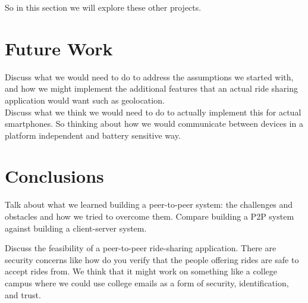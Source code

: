 \documentclass[letterpaper,11pt,twocolumn]{article}
\begin{document}
So in this section we will explore these other projects.

\section{Future Work}
Discuss what we would need to do to address the assumptions we started with, and how we might implement the additional features that an actual ride sharing application would want such as geolocation. \\

Discuss what we think we would need to do to actually implement this for actual smartphones. So thinking about how we would communicate between devices in a platform independent and battery sensitive way. 

\section{Conclusions}
Talk about what we learned building a peer-to-peer system: the challenges and obstacles and how we tried to overcome them. Compare building a P2P system against building a client-server system.

Discuss the feasibility of a peer-to-peer ride-sharing application. There are security concerns like how do you verify that the people offering rides are safe to accept rides from. We think that it might work on something like a college campus where we could use college emails as a form of security, identification, and trust.


%
%
\end{document}
